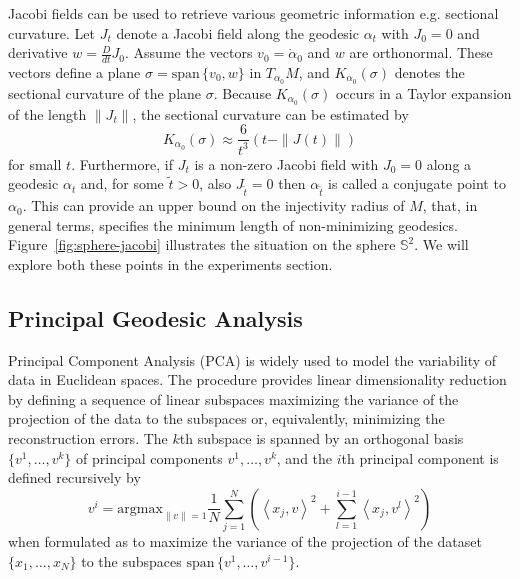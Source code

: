 \documentclass[final]{svjour3}
\newcommand{\argmax}{\mathrm{argmax}}
\newcommand{\Span}{\mathrm{span}\,}
\newcommand{\SSS}{\mathbb{S}}
\newcommand{\Df}[2]{\tfrac{D}{d#2} #1}
\newcommand{\ip}[1]{\left<#1\right>}
\begin{document}
Jacobi fields can be used to retrieve various geometric information e.g.
sectional curvature. Let $J_t$ denote a Jacobi field along the geodesic $\alpha_t$ with
$J_0=0$ and derivative $w=\Df{J_0}{t}$. Assume the vectors $v_0=\dot{\alpha}_0$ and $w$ 
are orthonormal. These vectors define
a plane $\sigma=\Span\{v_0,w\}$ in $T_{\alpha_0}M$, and $K_{\alpha_0}(\sigma)$ denotes the sectional
curvature of the plane $\sigma$. Because $K_{\alpha_0}(\sigma)$ occurs in a Taylor expansion of the length $\|J_t\|$,
the sectional curvature can be estimated by
\begin{equation}
    K_{\alpha_0}(\sigma)
    \approx
    \frac{6}{t^3}(t-\|J(t)\|)
    \label{eq:sec-curve}
\end{equation}
for small $t$.
Furthermore, if $J_t$ is a non-zero Jacobi field with $J_0=0$ along a geodesic
$\alpha_t$ and, for some
$\tilde{t}>0$, also $J_{\tilde{t}}=0$ then $\alpha_{\tilde{t}}$ is called a
conjugate point to $\alpha_0$. This
can provide an upper bound on the injectivity radius of $M$, that, in
general terms, specifies the minimum length of non-minimizing
geodesics. Figure~\ref{fig:sphere-jacobi} illustrates the situation on the
sphere $\SSS^2$. We will explore both these points in the experiments section.

\subsection{Principal Geodesic Analysis}
\label{sec:pga-def}
Principal Component Analysis (PCA) is widely used to model the
variability of data in Euclidean spaces. The procedure provides linear
dimensionality reduction by
defining a sequence of linear subspaces maximizing the variance of the projection
of the data to the subspaces or, equivalently, minimizing the reconstruction errors. The $k$th 
subspace is spanned by an orthogonal
basis $\{v^1,\ldots,v^k\}$ of principal components $v^1,\ldots,v^k$, and
the $i$th principal component is defined recursively by
\begin{equation}
    v^i
    =
    \argmax_{\|v\|=1}
    \frac{1}{N}
    \sum_{j=1}^N
    \left(\ip{x_j,v}^2+\sum_{l=1}^{i-1} \ip{x_j,v^l}^2\right)
    \label{eq:pca-cost}
\end{equation}
when formulated as to maximize the variance of the projection of the dataset
$\{x_1,\ldots,x_N\}$ to the subspaces $\Span\{v^1,\ldots,v^{i-1}\}$.
\end{document}
